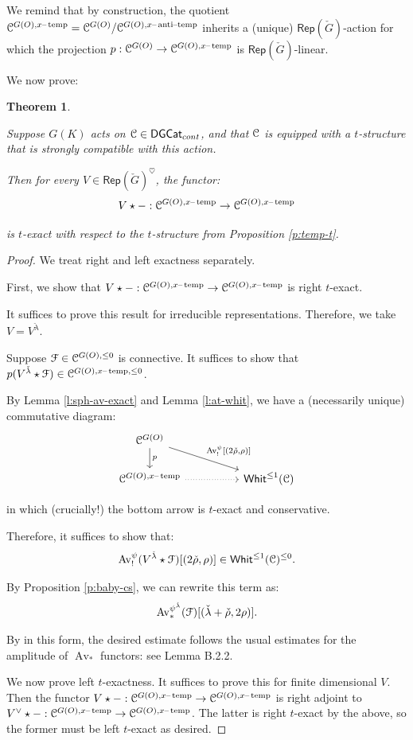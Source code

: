 \documentclass[reqno,11pt]{amsart}
\numberwithin{equation}{subsection}
\newtheorem{thm}{Theorem}[subsubsection]
\theoremstyle{remark}
\newcommand{\sC}{{\EuScript C}}
\newcommand{\sF}{{\EuScript F}}
\newcommand{\on}{\operatorname}
\newcommand{\mathendash}{\text{\textendash}}
\newcommand{\Rep}{\mathsf{Rep}}
\newcommand{\Whit}{\mathsf{Whit}}
\newcommand{\DGCat}{\mathsf{DGCat}}
\newcommand{\heart}{\heartsuit}
\newcommand{\Av}{\on{Av}}
\newcommand{\xat}{x\mathendash\on{anti}\!\mathendash\!\on{temp}}
\newcommand{\xtemp}{x\mathendash\on{temp}}
\begin{document}
We remind that by construction, the quotient 
$\sC^{G(O),\xtemp} = \sC^{G(O)}/\sC^{G(O),\xat}$ inherits
a (unique) $\Rep(\check{G})$-action for which the projection
$p:\sC^{G(O)} \to \sC^{G(O),\xtemp}$ is $\Rep(\check{G})$-linear.

We now prove:

\begin{thm}\label{t:hecke-exact-loc}

Suppose $G(K)$ acts on $\sC \in \DGCat_{cont}$, and that
$\sC$ is equipped with a $t$-structure that is strongly compatible with this action.

Then for every $V \in \Rep(\check{G})^{\heart}$, the functor:
%
\[
V \star -:\sC^{G(O),\xtemp} \to \sC^{G(O),\xtemp}
\]

\noindent is $t$-exact with respect to the $t$-structure from Proposition \ref{p:temp-t}.

\end{thm}

\begin{proof} 

We treat right and left exactness separately.

\step First, we show that $V \star -:\sC^{G(O),\xtemp} \to \sC^{G(O),\xtemp}$ is 
right $t$-exact.

It suffices to prove this result for irreducible representations.
Therefore, we take $V = V^{\check{\lambda}}$.

Suppose $\sF \in \sC^{G(O),\leq 0}$ is connective. It suffices to show
that $p(V^{\check{\lambda}} \star \sF) \in \sC^{G(O),\xtemp,\leq 0}$.

By Lemma \ref{l:sph-av-exact} and Lemma \ref{l:at-whit}, we have a (necessarily
unique) commutative diagram:
%
\[
\begin{tikzcd}
\sC^{G(O)} 
\arrow[d,"p"]
\arrow[drr,"{\Av_!^{\psi}[(2\check{\rho},\rho)]}"]
\\
\sC^{G(O),\xtemp} 
\arrow[rr,dotted]
&& 
\Whit^{\leq 1}(\sC)
\end{tikzcd}
\]

\noindent in which (crucially!) the bottom arrow is $t$-exact and conservative.

Therefore, it suffices to show that:
%
\[
\Av_!^{\psi}(V^{\check{\lambda}} \star \sF)[(2\check{\rho},\rho)] \in \Whit^{\leq 1}(\sC)^{\leq 0}.
\]

By Proposition \ref{p:baby-cs}, we can rewrite this term as:
%
\[
\Av_*^{\psi^{\check{\lambda}}}(\sF)[(\check{\lambda}+\check{\rho},2\rho)].
\]

\noindent By in this form, the desired estimate 
follows the usual estimates for the amplitude of $\Av_*$ functors: 
see \cite{whit} Lemma B.2.2.

\step 

We now prove left $t$-exactness. It suffices to prove this
for finite dimensional $V$. 
Then the functor $V \star -:\sC^{G(O),\xtemp} \to \sC^{G(O),\xtemp}$ is
right adjoint to $V^{\vee} \star -:\sC^{G(O),\xtemp} \to \sC^{G(O),\xtemp}$.
The latter is right $t$-exact by the above, so the former must be left $t$-exact
as desired.

\end{proof}
\end{document}
